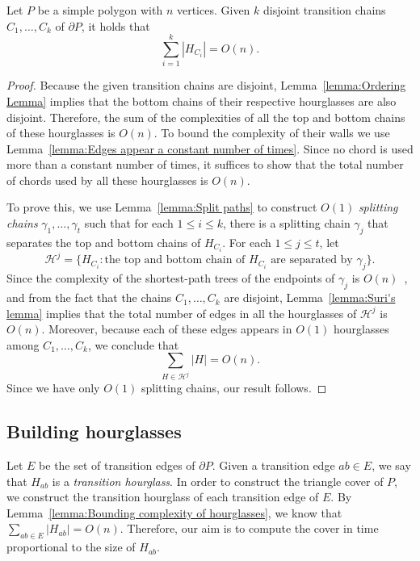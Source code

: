 \documentclass[a4paper,UKenglish]{lipics}
\begin{document}
\begin{lemma}\label{lemma:Bounding complexity of hourglasses}
Let $P$ be a simple polygon with $n$ vertices.
Given $k$ disjoint transition chains $C_1, \ldots, C_k$  of $\partial P$, it holds that  $$\sum_{i=1}^k |H_{C_i}| = O(n).$$
\end{lemma}
\begin{proof}

Because the given transition chains are disjoint, Lemma~\ref{lemma:Ordering Lemma} implies that the bottom chains of their respective hourglasses are also disjoint. Therefore, the sum of the complexities of all the top and bottom chains of these hourglasses is $O(n)$. 
To bound the complexity of their walls we use
Lemma~\ref{lemma:Edges appear a constant number of times}. Since  no chord is used more than a constant number of times, it suffices to show that the total number of chords used by all these hourglasses is $O(n)$.

To prove this, we use Lemma~\ref{lemma:Split paths} to construct $O(1)$ \emph{splitting chains} $\gamma_1, \ldots, \gamma_t$ such that for each $1\leq i\leq k$, there is a splitting chain $\gamma_j$ that separates the top and bottom chains of $H_{C_i}$.
For each $1\leq j\leq t$, let $$\mathcal H^j = \{H_{C_i} : \text{the top and bottom chain of $H_{C_i}$ are separated by }\gamma_j\}.$$
Since the complexity of the shortest-path trees of the endpoints of $\gamma_j$ is $O(n)$~\cite{guibasShortestPathTree},
and from the fact that the chains $C_1, \ldots, C_k$ are disjoint,  Lemma~\ref{lemma:Suri's lemma} implies that
the total number of edges in all the hourglasses of $\mathcal H^j$ is $O(n)$. Moreover, because each of these edges appears in $O(1)$ hourglasses among $C_1, \ldots, C_k$, we conclude that 
$$\sum_{H \in \mathcal H^j } |H| = O(n).$$
Since we have only $O(1)$ splitting chains, our result follows.
\end{proof}

\subsection{Building hourglasses}

Let $E$ be the set of transition edges of $\partial P$.
Given a transition edge $ab\in E$, we say that $H_{ab}$ is a \emph{transition hourglass}.
In order to construct the triangle cover of $P$, we construct the transition hourglass of each transition edge of $E$. By Lemma~\ref{lemma:Bounding complexity of hourglasses}, we know that $\sum_{ab\in E} |H_{ab}| = O(n)$. Therefore, our aim is to compute the cover in time proportional to the size of $H_{ab}$. %
\end{document}
